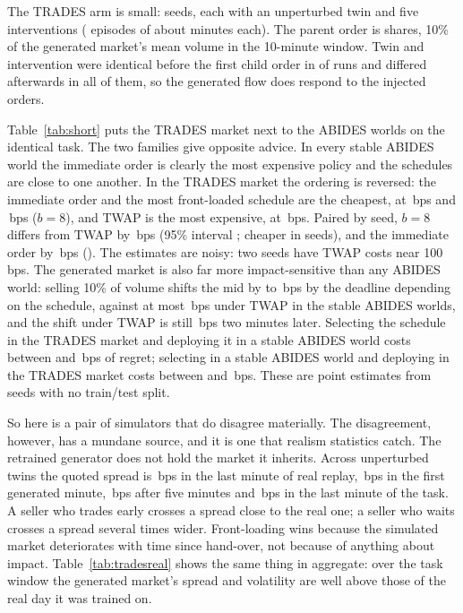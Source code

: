The TRADES arm is small: \tradesSeeds{} seeds, each with an unperturbed twin and five interventions (\nTradesEpisodes{} episodes of about \tradesWall{} minutes each). The parent order is \tradesQty{} shares, 10\% of the generated market's mean volume in the 10-minute window. Twin and intervention were identical before the first child order in \tradesPreIdentical{} of runs and differed afterwards in all of them, so the generated flow does respond to the injected orders.



Table~\ref{tab:short} puts the TRADES market next to the ABIDES worlds on the identical task. The two families give opposite advice. In every stable ABIDES world the immediate order is clearly the most expensive policy and the schedules are close to one another. In the TRADES market the ordering is reversed: the immediate order and the most front-loaded schedule are the cheapest, at \tradesCostImm{}\,bps and \tradesCostFront{}\,bps ($b=8$), and TWAP is the most expensive, at \tradesCostTwap{}\,bps. Paired by seed, $b=8$ differs from TWAP by \tradesDiffFront{}\,bps (95\% interval \tradesDiffFrontCI{}; cheaper in \tradesDiffFrontN{} seeds), and the immediate order by \tradesDiffImm{}\,bps (\tradesDiffImmCI{}). The estimates are noisy: two seeds have TWAP costs near 100\,bps. The generated market is also far more impact-sensitive than any ABIDES world: selling 10\% of volume shifts the mid by \tradesDispMin{} to \tradesDispMax{}\,bps by the deadline depending on the schedule, against at most \abidesShortDispMax{}\,bps under TWAP in the stable ABIDES worlds, and the shift under TWAP is still \tradesDispTwapPost{}\,bps two minutes later. Selecting the schedule in the TRADES market and deploying it in a stable ABIDES world costs between \tradesToAbidesMin{} and \tradesToAbidesMax{}\,bps of regret; selecting in a stable ABIDES world and deploying in the TRADES market costs between \abidesToTradesMin{} and \abidesToTradesMax{}\,bps. These are point estimates from \tradesSeeds{} seeds with no train/test split.

So here is a pair of simulators that do disagree materially. The disagreement, however, has a mundane source, and it is one that realism statistics catch. The retrained generator does not hold the market it inherits. Across unperturbed twins the quoted spread is \tradesSpreadReplay{}\,bps in the last minute of real replay, \tradesSpreadFirst{}\,bps in the first generated minute, \tradesSpreadMid{}\,bps after five minutes and \tradesSpreadLast{}\,bps in the last minute of the task. A seller who trades early crosses a spread close to the real one; a seller who waits crosses a spread several times wider. Front-loading wins because the simulated market deteriorates with time since hand-over, not because of anything about impact. Table~\ref{tab:tradesreal} shows the same thing in aggregate: over the task window the generated market's spread and volatility are well above those of the real day it was trained on.

